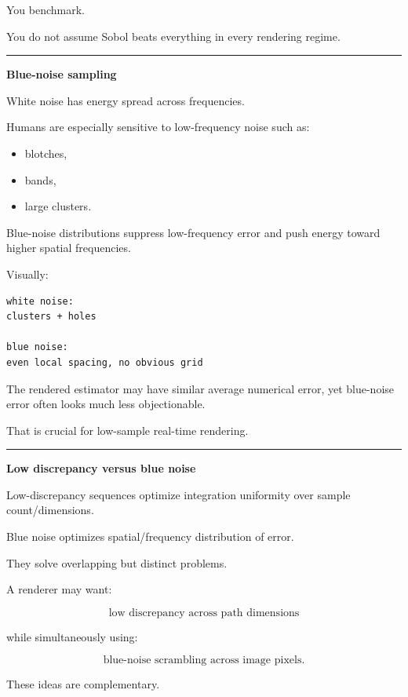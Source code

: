 You benchmark.

You do not assume Sobol beats everything in every rendering regime.

\begin{center}\rule{0.5\linewidth}{0.5pt}\end{center}

\textbf{Blue-noise sampling}

White noise has energy spread across frequencies.

Humans are especially sensitive to low-frequency noise such as:

\begin{itemize}
\tightlist
\item
  blotches,
\item
  bands,
\item
  large clusters.
\end{itemize}

Blue-noise distributions suppress low-frequency error and push energy toward higher spatial frequencies.

Visually:

\begin{verbatim}
white noise:
clusters + holes

blue noise:
even local spacing, no obvious grid
\end{verbatim}

The rendered estimator may have similar average numerical error, yet blue-noise error often looks much less objectionable.

That is crucial for low-sample real-time rendering.

\begin{center}\rule{0.5\linewidth}{0.5pt}\end{center}

\textbf{Low discrepancy versus blue noise}

Low-discrepancy sequences optimize integration uniformity over sample count/dimensions.

Blue noise optimizes spatial/frequency distribution of error.

They solve overlapping but distinct problems.

A renderer may want:

\[
\text{low discrepancy across path dimensions}
\]

while simultaneously using:

\[
\text{blue-noise scrambling across image pixels}.
\]

These ideas are complementary.

